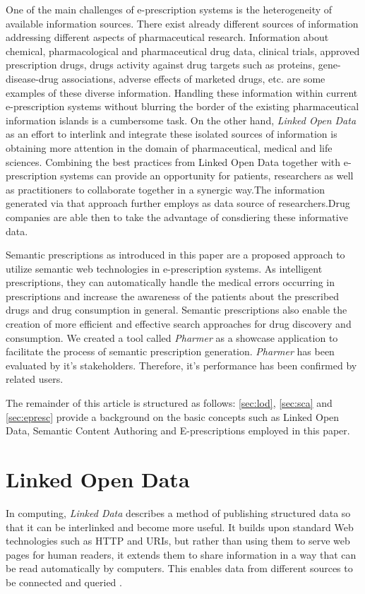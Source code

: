 \documentclass[10pt, conference, compsocconf]{IEEEtran}
\begin{document}
One of the main challenges of e-prescription systems is the heterogeneity of available information sources.
There exist already different sources of information addressing different aspects of pharmaceutical research.
Information about chemical, pharmacological and pharmaceutical drug data, clinical trials, approved prescription drugs, drugs activity against drug targets such as proteins, gene-disease-drug associations, adverse effects of marketed drugs, etc. are some examples of these diverse information.
Handling these information within current e-prescription systems without blurring the border of the existing pharmaceutical information islands is a cumbersome task.
On the other hand, \emph{Linked Open Data} as an effort to interlink and integrate these isolated sources of information is obtaining more attention in the domain of pharmaceutical, medical and life sciences.
Combining the best practices from Linked Open Data together with e-prescription systems can provide an opportunity for patients, researchers as well as practitioners to collaborate together in a synergic way.The information generated via that approach further employs as data source of researchers.Drug companies are able then to take the advantage of consdiering these informative data.

Semantic prescriptions as introduced in this paper are a proposed approach to utilize semantic web technologies in e-prescription systems.
As intelligent prescriptions, they can automatically handle the medical errors occurring in prescriptions and increase the awareness of the patients about the prescribed drugs and drug consumption in general.
Semantic prescriptions also enable the creation of more efficient and effective search approaches for drug discovery and consumption.
We created a tool called \emph{Pharmer} as a showcase application to facilitate the process of semantic prescription generation.
\emph{Pharmer} has been evaluated by it's stakeholders. Therefore, it's performance has been confirmed by related users.

The remainder of this article is structured as follows:
\autoref{sec:lod}, \autoref{sec:sca} and \autoref{sec:epresc} provide a background on the basic concepts such as Linked Open Data, Semantic Content Authoring and E-prescriptions employed in this paper.


\section{Linked Open Data}
\label{sec:lod}
In computing, \emph{Linked Data} describes a method of publishing structured data so that it can be interlinked and become more useful.
It builds upon standard Web technologies such as HTTP and URIs, but rather than using them to serve web pages for human readers, it extends them to share information in a way that can be read automatically by computers.
This enables data from different sources to be connected and queried \cite{linkeddata}.
\end{document}
